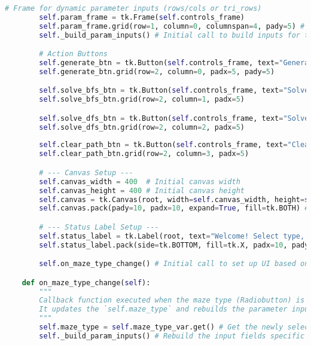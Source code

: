 \documentclass[UTF8]{report}
\theoremstyle{MyLineTheoremStyle} %
\theoremstyle{MyBlockTheoremStyle} %
\theoremstyle{MySubsubsectionStyle} %
\begin{document}
\begin{lstlisting}[language=Python, caption={迷宫生成与求解程序代码}]
        # Frame for dynamic parameter inputs (rows/cols or tri_rows)
        self.param_frame = tk.Frame(self.controls_frame)
        self.param_frame.grid(row=1, column=0, columnspan=4, pady=5) # Adjusted columnspan
        self._build_param_inputs() # Initial call to build inputs for the default maze type

        # Action Buttons
        self.generate_btn = tk.Button(self.controls_frame, text="Generate Maze", command=self.generate_maze_action)
        self.generate_btn.grid(row=2, column=0, padx=5, pady=5) 

        self.solve_bfs_btn = tk.Button(self.controls_frame, text="Solve (BFS - Shortest)", command=lambda: self.solve_maze_action('bfs'))
        self.solve_bfs_btn.grid(row=2, column=1, padx=5) 

        self.solve_dfs_btn = tk.Button(self.controls_frame, text="Solve (DFS)", command=lambda: self.solve_maze_action('dfs'))
        self.solve_dfs_btn.grid(row=2, column=2, padx=5) 
        
        self.clear_path_btn = tk.Button(self.controls_frame, text="Clear Path", command=self.clear_path_display_action)
        self.clear_path_btn.grid(row=2, column=3, padx=5) 

        # --- Canvas Setup ---
        self.canvas_width = 400  # Initial canvas width
        self.canvas_height = 400 # Initial canvas height
        self.canvas = tk.Canvas(root, width=self.canvas_width, height=self.canvas_height, bg='ivory', highlightthickness=1, highlightbackground="black")
        self.canvas.pack(pady=10, padx=10, expand=True, fill=tk.BOTH) # Pack canvas to fill available space

        # --- Status Label Setup ---
        self.status_label = tk.Label(root, text="Welcome! Select type, adjust size, and generate.", relief=tk.SUNKEN, anchor="w")
        self.status_label.pack(side=tk.BOTTOM, fill=tk.X, padx=10, pady=5) # Pack status label at the bottom

        self.on_maze_type_change() # Initial call to set up UI based on default maze type

    def on_maze_type_change(self):
        """
        Callback function executed when the maze type (Radiobutton) is changed.
        It updates the `self.maze_type` and rebuilds the parameter input fields.
        """
        self.maze_type = self.maze_type_var.get() # Get the newly selected maze type
        self._build_param_inputs() # Rebuild the input fields specific to this maze type


\end{lstlisting}
\end{document}
